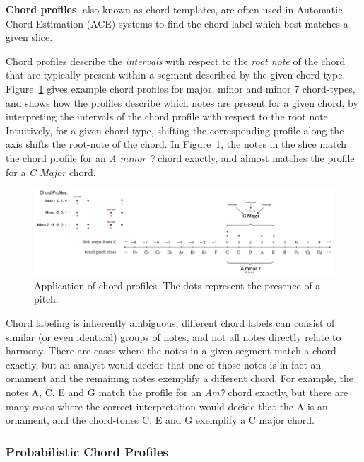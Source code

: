 \documentclass[12pt,a4paper,twoside,openany]{report} \usepackage[pdfborder={0 0 0}]{hyperref}    %
\theoremstyle{definition} \newtheorem{definition}{Definition}[section]
\begin{document}
\textbf{Chord profiles}, also known as chord templates, are often used in Automatic Chord Estimation (ACE) systems to
find the chord label which best matches a given slice. 

Chord profiles describe the \textit{intervals} with respect to the \textit{root note} of the chord that
are typically present within a segment described by the given chord type. Figure~\ref{fig:chordProfiles} gives
example chord profiles for major, minor and minor 7 chord-types, and shows how the profiles describe which notes are present for
a given chord, by interpreting the intervals of the chord profile with respect to the root note. Intuitively, for
a given chord-type, shifting the corresponding profile along the axis shifts the root-note of the chord. In
Figure~\ref{fig:chordProfiles}, the notes in the slice match the chord profile for an \textit{A minor 7} chord exactly,
and almost matches the profile for a \textit{C Major} chord.

\begin{figure}[ht]
  \begin{center}
    \includegraphics[width=\textwidth]{figs/prep/inferringHarmony/chordProfiles.png}
  \end{center}
  \caption{Application of chord profiles. The dots represent the presence of a pitch.}
  \label{fig:chordProfiles}
\end{figure}

Chord labeling is inherently ambiguous; different chord labels can consist of similar (or even identical)
groups of notes, and not all notes directly relate to harmony. There are cases where the notes in a given segment
match a chord exactly, but an analyst would decide that one of those notes is in fact an ornament and the remaining
notes exemplify a different chord. For example, the notes A, C, E and G match the profile for an \textit{Am7} chord exactly, but there
are many cases where the correct interpretation would decide that the A is an ornament, and the chord-tones C, E and
G exemplify a C major chord. 

\subsubsection{Probabilistic Chord Profiles}
\label{sub:probChordProfiles}
\end{document}
